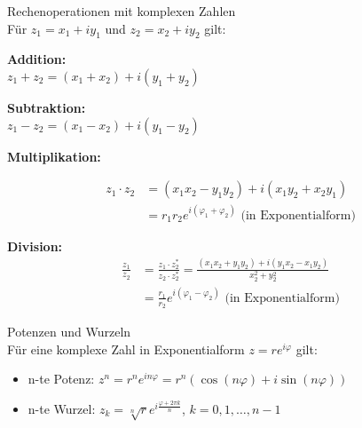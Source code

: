 \begin{theorem}{Rechenoperationen mit komplexen Zahlen}\\
Für $z_1 = x_1 + iy_1$ und $z_2 = x_2 + iy_2$ gilt:
\vspace{1mm}\\
\begin{minipage}[t]{0.45\textwidth}
    \textbf{Addition:}\\
    $z_1 + z_2 = (x_1 + x_2) + i(y_1 + y_2)$
\end{minipage}
\hspace{3mm}
\begin{minipage}[t]{0.45\textwidth}
    \textbf{Subtraktion:}\\
    $z_1 - z_2 = (x_1 - x_2) + i(y_1 - y_2)$
\end{minipage}

\begin{minipage}{0.28\textwidth}
    \textbf{Multiplikation:}
\end{minipage}
\begin{minipage}{0.68\textwidth}
    \begin{align*}
        z_1 \cdot z_2 &= (x_1x_2 - y_1y_2) + i(x_1y_2 + x_2y_1)\\
        &= r_1r_2e^{i(\varphi_1 + \varphi_2)} \text{ (in Exponentialform)}
    \end{align*}
\end{minipage}



\textbf{Division:}
\begin{align*}
    \frac{z_1}{z_2} &= \frac{z_1 \cdot z_2^*}{z_2 \cdot z_2^*} = \frac{(x_1x_2 + y_1y_2) + i(y_1x_2 - x_1y_2)}{x_2^2 + y_2^2}\\
    &= \frac{r_1}{r_2}e^{i(\varphi_1 - \varphi_2)} \text{ (in Exponentialform)}
\end{align*}
\end{theorem}

\begin{corollary}{Potenzen und Wurzeln}\\
Für eine komplexe Zahl in Exponentialform $z = re^{i\varphi}$ gilt:
\begin{itemize}
    \item n-te Potenz: $z^n = r^ne^{in\varphi} = r^n(\cos(n\varphi) + i\sin(n\varphi))$
    \item n-te Wurzel: $z_k = \sqrt[n]{r}e^{i\frac{\varphi + 2\pi k}{n}}$, $k = 0,1,\ldots,n-1$
\end{itemize}
\end{corollary}

